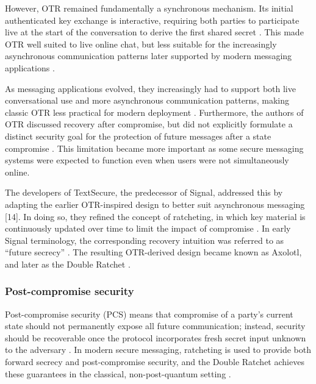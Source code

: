 However, OTR remained fundamentally a synchronous mechanism. Its initial authenticated key exchange is interactive, requiring both parties to participate live at the start of the conversation to derive the first shared secret \cite{ref10}. This made OTR well suited to live online chat, but less suitable for the increasingly asynchronous communication patterns later supported by modern messaging applications \cite{ref14}. 

As messaging applications evolved, they increasingly had to support both live conversational use and more asynchronous communication patterns, making classic OTR less practical for modern deployment \cite{ref14}. Furthermore, the authors of OTR discussed recovery after compromise, but did not explicitly formulate a distinct security goal for the protection of future messages after a state compromise \cite{ref10}\cite{ref12}. This limitation became more important as some secure messaging systems were expected to function even when users were not simultaneously online. 

The developers of TextSecure, the predecessor of Signal, addressed this by adapting the earlier OTR-inspired design to better suit asynchronous messaging [14]. In doing so, they refined the concept of ratcheting, in which key material is continuously updated over time to limit the impact of compromise \cite{ref14}. In early Signal terminology, the corresponding recovery intuition was referred to as “future secrecy” \cite{ref11}\cite{ref12}\cite{ref14}. The resulting OTR-derived design became known as Axolotl, and later as the Double Ratchet \cite{ref12}. 

\subsubsection{Post-compromise security}
Post-compromise security (PCS) means that compromise of a party’s current state should not permanently expose all future communication; instead, security should be recoverable once the protocol incorporates fresh secret input unknown to the adversary \cite{ref12}. In modern secure messaging, ratcheting is used to provide both forward secrecy and post-compromise security, and the Double Ratchet achieves these guarantees in the classical, non-post-quantum setting \cite{ref16}. 

